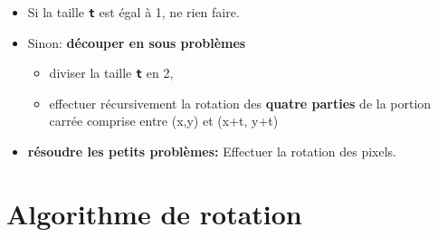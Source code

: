 \documentclass[svgnames,11pt]{beamer}
\begin{document}
\begin{frame}
    \frametitle{}

    \begin{itemize}
        \item Si la taille \texttt{\textbf{t}} est égal à 1, ne rien faire.
        \item Sinon: \textbf{découper en sous problèmes}
              \begin{itemize}
                  \item diviser la taille \textbf{\texttt{t}} en 2,
                  \item effectuer récursivement la rotation des \textbf{quatre parties} de la portion carrée comprise entre (x,y) et (x+t, y+t)
              \end{itemize}
        \item \textbf{résoudre les petits problèmes:} Effectuer la rotation des pixels.
    \end{itemize}

\end{frame}
\section{Algorithme de rotation}
\end{document}
